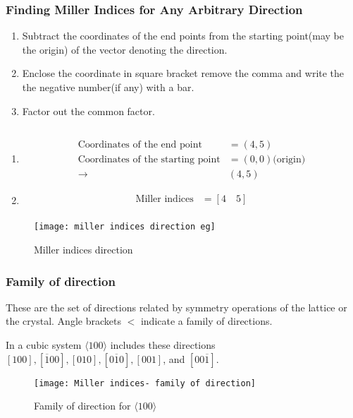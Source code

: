   \subsubsection{Finding Miller Indices for Any Arbitrary Direction}
  \begin{enumerate}
  	\item Subtract the coordinates of the end points from the starting point(may be the origin) of the vector denoting the direction.
  	\item Enclose the coordinate in square bracket remove the comma and write the the negative number(if any) with a bar.
  	\item Factor out the common factor.
  	  \end{enumerate}
  	\begin{example}$\left. \right. $\\
  		\begin{minipage}{0.65\textwidth}
  			\begin{enumerate}
  				\item 	\begin{align*}
  			\text{Coordinates of the end point}&=(4,5)\\
  				\text{Coordinates of the starting point}&=(0,0) \text{(origin)}\\
  				\rightarrow &(4,5)
  				\end{align*}
  					\item 	\begin{align*}
  				\text{Miller indices}&=[4 \quad 5]\\
  			\end{align*}
  			\end{enumerate}
  		
  		
  		\end{minipage}\hfil
  	\begin{minipage}{0.25\textwidth}
  		\begin{figure}[H]
  			\centering
  			\texttt{[image: miller indices direction eg]}
  			\caption{ Miller indices direction }
  			\label{}
  		\end{figure}
  	\end{minipage}
  		
  	\end{example}
\subsubsection{Family of direction}
These are the set of directions related by symmetry operations of the lattice or the crystal. Angle brackets $<$ indicate a family of directions. 
\begin{example}
	In a cubic system $\langle 100\rangle$ includes these directions $[100],[\overline{1} 00],[010],[0 \overline{1} 0],[001]$, and $[00 \overline{1}]$.
\end{example}
\begin{figure}[H]
	\centering
	\texttt{[image: Miller indices- family of direction]}
	\caption{Family of direction for $\langle 100\rangle$}
	\label{}
\end{figure}

